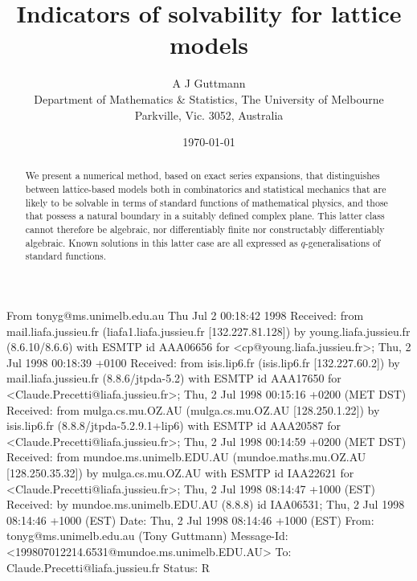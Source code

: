 From tonyg@ms.unimelb.edu.au Thu Jul  2 00:18:42 1998
Received: from mail.liafa.jussieu.fr (liafa1.liafa.jussieu.fr [132.227.81.128]) by young.liafa.jussieu.fr (8.6.10/8.6.6) with ESMTP id AAA06656 for <cp@young.liafa.jussieu.fr>; Thu, 2 Jul 1998 00:18:39 +0100
Received: from isis.lip6.fr (isis.lip6.fr [132.227.60.2])
          by mail.liafa.jussieu.fr (8.8.6/jtpda-5.2) with ESMTP id AAA17650
          for <Claude.Precetti@liafa.jussieu.fr>; Thu, 2 Jul 1998 00:15:16 +0200 (MET DST)
Received: from mulga.cs.mu.OZ.AU (mulga.cs.mu.OZ.AU [128.250.1.22])
          by isis.lip6.fr (8.8.8/jtpda-5.2.9.1+lip6) with ESMTP id AAA20587
          for <Claude.Precetti@liafa.jussieu.fr>; Thu, 2 Jul 1998 00:14:59 +0200 (MET DST)
Received: from mundoe.ms.unimelb.EDU.AU (mundoe.maths.mu.OZ.AU [128.250.35.32]) by mulga.cs.mu.OZ.AU with ESMTP
	id IAA22621 for <Claude.Precetti@liafa.jussieu.fr>; Thu, 2 Jul 1998 08:14:47 +1000 (EST)
Received: by mundoe.ms.unimelb.EDU.AU (8.8.8)
	id IAA06531; Thu, 2 Jul 1998 08:14:46 +1000 (EST)
Date: Thu, 2 Jul 1998 08:14:46 +1000 (EST)
From: tonyg@ms.unimelb.edu.au (Tony Guttmann)
Message-Id: <199807012214.6531@mundoe.ms.unimelb.EDU.AU>
To: Claude.Precetti@liafa.jussieu.fr
Status: R

\textheight=22.0cm
\newcommand{\D}{\Delta}
\newcommand{\cs}{correction-to-scaling}

\title{Indicators of solvability for lattice models}
\author{ A J Guttmann  \\
Department of Mathematics \& Statistics, The University of Melbourne\\
Parkville, Vic. 3052, Australia}
\date{\today}
\maketitle

\begin{abstract}
We present a numerical method, based on exact series expansions,
that distinguishes between lattice-based models both in combinatorics
and statistical mechanics that are likely to be solvable in
terms of standard functions of mathematical physics, and those
that possess a natural boundary in a suitably defined complex
plane. This latter class cannot
therefore be algebraic, nor differentiably finite
nor constructably differentiably algebraic.
Known solutions in this latter case are all expressed as
$q$-generalisations of standard functions.
 \end{abstract}
